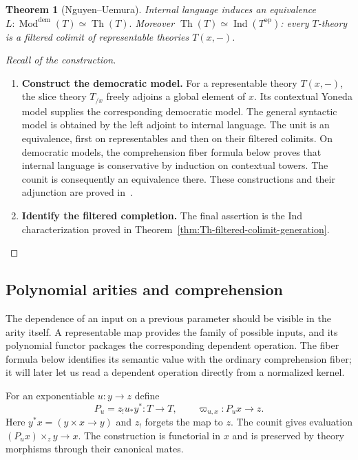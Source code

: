 \documentclass[oneside]{article}
\theoremstyle{plain}
\newtheorem{theorem}{Theorem}[section]
\theoremstyle{definition}
\theoremstyle{remark}
\newcommand{\Moddem}{\operatorname{Mod}^{\mathrm{dem}}}
\newcommand{\Th}{\operatorname{Th}}
\newcommand{\op}{\mathrm{op}}
\begin{document}
\begin{theorem}[Nguyen--Uemura]\label{thm:democracy}
    Internal language induces an equivalence $L:\Moddem(T)\simeq\Th(T).$ Moreover $\Th(T)\simeq\operatorname{Ind}(T^{\op})$: every $T$-theory is a filtered colimit of representable theories $T(x,-)$.
\end{theorem}
\begin{proof}[Recall of the construction]
    \leavevmode
    \begin{enumerate}
        \item \textbf{Construct the democratic model.} For a representable theory $T(x,-)$, the slice theory $T_{/x}$ freely adjoins a global element of $x$. Its contextual Yoneda model supplies the corresponding democratic model. The general syntactic model is obtained by the left adjoint to internal language. The unit is an equivalence, first on representables and then on their filtered colimits. On democratic models, the comprehension fiber formula below proves that internal language is conservative by induction on contextual towers. The counit is consequently an equivalence there. These constructions and their adjunction are proved in~\cite[\S4, Thm.~4.14]{NguyenUemura2025}.
        
        \item \textbf{Identify the filtered completion.} The final assertion is the Ind characterization proved in Theorem~\ref{thm:Th-filtered-colimit-generation}.\qedhere
    \end{enumerate}
\end{proof}

\subsection{Polynomial arities and comprehension}
\label{subsec:polynomials}

The dependence of an input on a previous parameter should be visible in
the arity itself. A representable map provides the family of possible
inputs, and its polynomial functor packages the corresponding dependent
operation. The fiber formula below identifies its semantic value with the
ordinary comprehension fiber; it will later let us read a dependent
operation directly from a normalized kernel.

For an exponentiable $u:y\to z$ define
\[
    P_u=z_!u_*y^*:T\longrightarrow T,
    \qquad \varpi_{u,x}:P_ux\longrightarrow z.
\]
Here $y^*x=(y\times x\to y)$ and $z_!$ forgets the map to $z$. The counit gives evaluation $(P_ux)\times_z y\to x$. The construction is functorial in $x$ and is preserved by theory morphisms through their canonical mates.
\end{document}
